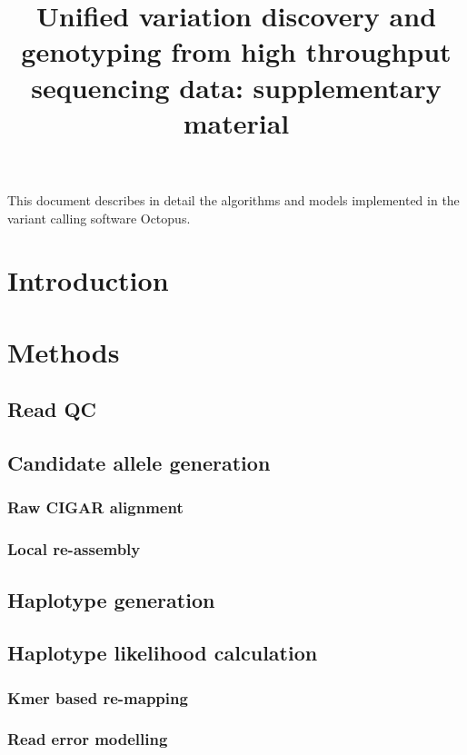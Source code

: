 \documentclass{article}
\title{Unified variation discovery and genotyping from high throughput sequencing data: supplementary material}
\author{}
\date{}
\begin{document}
\maketitle

This document describes in detail the algorithms and models implemented in the variant calling software Octopus.

\tableofcontents

\section{Introduction}

\section{Methods}

\subsection{Read QC}

\subsection{Candidate allele generation}

\subsubsection{Raw CIGAR alignment}

\subsubsection{Local re-assembly}

\subsection{Haplotype generation}

\subsection{Haplotype likelihood calculation}

\subsubsection{Kmer based re-mapping}

\subsubsection{Read error modelling}
\end{document}
